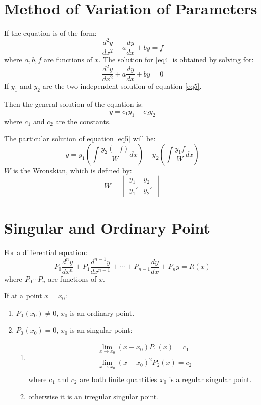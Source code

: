 \section{Method of Variation of Parameters}
If the equation is of the form:
\begin{equation}
	\dfrac{d^2y}{dx^2}+a\dfrac{dy}{dx}+by=f\label{eq4}
\end{equation}
where $a,b,f$ are functions of $x$. The solution for \ref{eq4} is obtained by solving for:
\begin{equation}\label{eq5}
	\dfrac{d^2y}{dx^2}+a\dfrac{dy}{dx}+by=0
\end{equation}
If $y_1$ and $y_2$ are the two independent solution of equation \ref{eq5}.

Then the general solution of the equation is:
\begin{equation}
	y=c_1y_1+c_2y_2
\end{equation}
where $c_1$ and $c_2$ are the constants.

The particular solution of equation \ref{eq5} will be:
\begin{equation}
	y=y_1 \left(\int \dfrac{y_2(-f)}{W}dx\right)+y_2\left(\int \dfrac{y_1 f}{W}dx\right)
\end{equation}
$W$ is the Wronskian, which is defined by:
\begin{equation}
	W=\begin{vmatrix}
		y_1&y_2\\
		y_1'&y_2'
	\end{vmatrix}
\end{equation}


\section{Singular and Ordinary Point}
For a differential equation:
\begin{equation}
	P_0 \dfrac{d^n y}{dx^n}+P_1 \dfrac{d^{n-1}y}{dx^{n-1}}+\cdots+P_{n-1} \dfrac{dy}{dx}+P_n y=R(x)
\end{equation}
where $P_0 \cdots P_n$ are functions of $x$.

If at a point $x=x_0$:
\begin{enumerate}
	\item $P_0(x_0) \neq 0$, $x_0$ is an ordinary point.
	\item $P_0(x_0)=0$, $x_0$ is an singular point:
	\begin{enumerate}
		\item
		\begin{align}
			\lim_{x\to x_0}(x-x_0)P_1(x)=c_1\\
			\lim_{x\to x_0}(x-x_0)^2P_2(x)=c_2\\
		\end{align}
		where $c_1$ and $c_2$ are both finite quantities $x_0$ is a regular singular point.
		\item otherwise it is an irregular singular point.
	\end{enumerate}
\end{enumerate}
